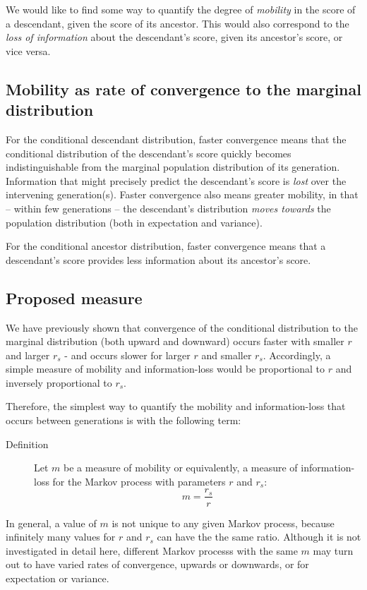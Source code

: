 \documentclass[a4paper,11pt]{article} %
\begin{document}
We would like to find some way to quantify the degree of \emph{mobility} in the score of a descendant, given the score of its ancestor. This would also correspond to the \emph{loss of information} about the descendant's score, given its ancestor's score, or vice versa.

\subsection{Mobility as rate of convergence to the marginal distribution}
For the conditional descendant distribution, faster convergence means that the conditional distribution of the descendant's score quickly becomes indistinguishable from the marginal population distribution of its generation. Information that might precisely predict the descendant's score is \emph{lost} over the intervening generation(s). Faster convergence also means greater mobility, in that -- within few generations -- the descendant's distribution \emph{moves towards} the population distribution (both in expectation and variance). 

For the conditional ancestor distribution, faster convergence means that a descendant's score provides less information about its ancestor's score. 

\subsection{Proposed measure}
We have previously shown that convergence of the conditional distribution to the marginal distribution (both upward and downward) occurs faster with smaller $r$ and larger $r_s$ - and occurs slower for larger $r$ and smaller $r_s$. Accordingly, a simple measure of mobility and information-loss would be proportional to $r$ and inversely proportional to $r_s$. 

Therefore, the simplest way to quantify the mobility and information-loss that occurs between generations is with the following term:

\begin{description}
\item [Definition] Let $m$ be a measure of mobility or equivalently, a measure of information-loss for the Markov process with parameters $r$ and $r_s$:
$$m = \frac{r_s}{r}$$
\end{description}

In general, a value of $m$ is not unique to any given Markov process, because infinitely many values for $r$ and $r_s$ can have the the same ratio. Although it is not investigated in detail here, different Markov processs with the same $m$ may turn out to have varied rates of convergence, upwards or downwards, or for expectation or variance. 
\end{document}
